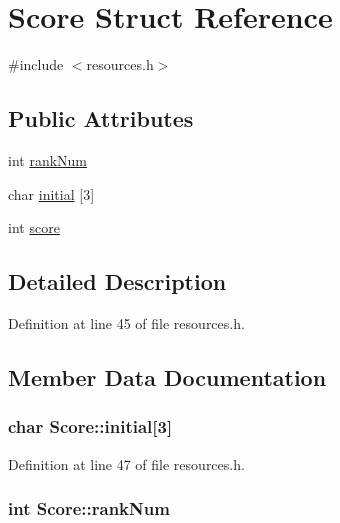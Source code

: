 \hypertarget{struct_score}{\section{Score Struct Reference}
\label{struct_score}
}


{\ttfamily \#include $<$resources.\-h$>$}

\subsection*{Public Attributes}
\begin{DoxyCompactItemize}
\item 
int \hyperlink{struct_score_af537c4bad0738a72bea1cbee8d38b0a0}{rank\-Num}
\item 
char \hyperlink{struct_score_a5d149221823e63acce30b844db826c68}{initial} \mbox{[}3\mbox{]}
\item 
int \hyperlink{struct_score_a331b0927105c83ba760954eff6cf9fe9}{score}
\end{DoxyCompactItemize}


\subsection{Detailed Description}


Definition at line 45 of file resources.\-h.



\subsection{Member Data Documentation}
\hypertarget{struct_score_a5d149221823e63acce30b844db826c68}{
\subsubsection[{initial}]{\setlength{\rightskip}{0pt plus 5cm}char Score\-::initial\mbox{[}3\mbox{]}}}\label{struct_score_a5d149221823e63acce30b844db826c68}


Definition at line 47 of file resources.\-h.

\hypertarget{struct_score_af537c4bad0738a72bea1cbee8d38b0a0}{
\subsubsection[{rank\-Num}]{\setlength{\rightskip}{0pt plus 5cm}int Score\-::rank\-Num}}\label{struct_score_af537c4bad0738a72bea1cbee8d38b0a0}



